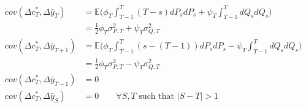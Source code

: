 \begin{align}
cov(\Delta c_T^*, \Delta \bar{y}_T) &=  \mathbb{E} \Big( \phi_T \int_{T-1}^{T} (T-s) dP_s dP_s + \psi_T \int_{T-1}^{T} dQ_s dQ_s \Big) \nonumber \\
&= \frac{1}{2} \phi_T \sigma^2_{P,T} + \psi_T \sigma^2_{Q,T} \\
cov(\Delta c_T^*, \Delta \bar{y}_{T+1}) &=  \mathbb{E} \Big( \phi_T \int_{T-1}^{T} (s-(T-1)) dP_s dP_s - \psi_T \int_{T-1}^{T} dQ_s dQ_s \Big) \nonumber \\
&= \frac{1}{2} \phi_T \sigma^2_{P,T} - \psi_T \sigma^2_{Q,T} \\
cov(\Delta c_T^*, \Delta \bar{y}_{T-1}) &= 0 \\
cov(\Delta c_T^*, \Delta \bar{y}_{S}) &= 0 \qquad \forall S,T \text{ such that }|S-T| >1 
\end{align}